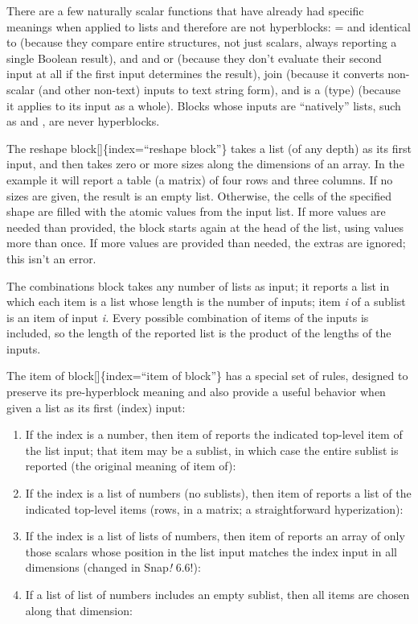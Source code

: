 \documentclass[
  letterpaper,
]{book}
\begin{document}
There are a few naturally scalar functions that have already had
specific meanings when applied to lists and therefore are not
hyperblocks: = and identical to (because they compare entire structures,
not just scalars, always reporting a single Boolean result), and and or
(because they don't evaluate their second input at all if the first
input determines the result), join (because it converts non-scalar (and
other non-text) inputs to text string form), and is a (type) (because it
applies to its input as a whole). Blocks whose inputs are ``natively''
lists, such as and , are never hyperblocks.

The reshape block{[}{]}\{index=``reshape block''\} takes a list (of any
depth) as its first input, and then takes zero or more sizes along the
dimensions of an array. In the example it will report a table (a matrix)
of four rows and three columns. If no sizes are given, the result is an
empty list. Otherwise, the cells of the specified shape are filled with
the atomic values from the input list. If more values are needed than
provided, the block starts again at the head of the list, using values
more than once. If more values are provided than needed, the extras are
ignored; this isn't an error.

The combinations block takes any number of lists as input; it reports a
list in which each item is a list whose length is the number of inputs;
item \emph{i} of a sublist is an item of input \emph{i.} Every possible
combination of items of the inputs is included, so the length of the
reported list is the product of the lengths of the inputs.

The item of block{[}{]}\{index=``item of block''\} has a special set of
rules, designed to preserve its pre-hyperblock meaning and also provide
a useful behavior when given a list as its first (index) input:

\begin{enumerate}
\def\labelenumi{\arabic{enumi}.}
\item
  If the index is a number, then item of reports the indicated top-level
  item of the list input; that item may be a sublist, in which case the
  entire sublist is reported (the original meaning of item of):
\item
  If the index is a list of numbers (no sublists), then item of reports
  a list of the indicated top-level items (rows, in a matrix; a
  straightforward hyperization):
\item
  If the index is a list of lists of numbers, then item of reports an
  array of only those scalars whose position in the list input matches
  the index input in all dimensions (changed in Snap\emph{!} 6.6!):
\item
  If a list of list of numbers includes an empty sublist, then all items
  are chosen along that dimension:
\end{enumerate}
\end{document}
